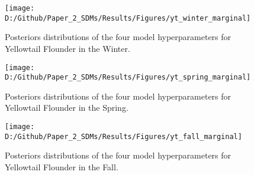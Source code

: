 \documentclass[
]{article}
\begin{document}
\clearpage

\begin{figure}[htb]

{\centering \texttt{[image: D:/Github/Paper\_2\_SDMs/Results/Figures/yt\_winter\_marginal]} 

}

\caption{Posteriors distributions of the four model hyperparameters for Yellowtail Flounder in the Winter.}\label{fig:hyper-yt-winter-post}
\end{figure}

\clearpage

\begin{figure}[htb]

{\centering \texttt{[image: D:/Github/Paper\_2\_SDMs/Results/Figures/yt\_spring\_marginal]} 

}

\caption{Posteriors distributions of the four model hyperparameters for Yellowtail Flounder in the Spring.}\label{fig:hyper-yt-spring-post}
\end{figure}

\clearpage

\begin{figure}[htb]

{\centering \texttt{[image: D:/Github/Paper\_2\_SDMs/Results/Figures/yt\_fall\_marginal]} 

}

\caption{Posteriors distributions of the four model hyperparameters for Yellowtail Flounder in the Fall.}\label{fig:hyper-yt-fall-post}
\end{figure}

\clearpage
\end{document}
